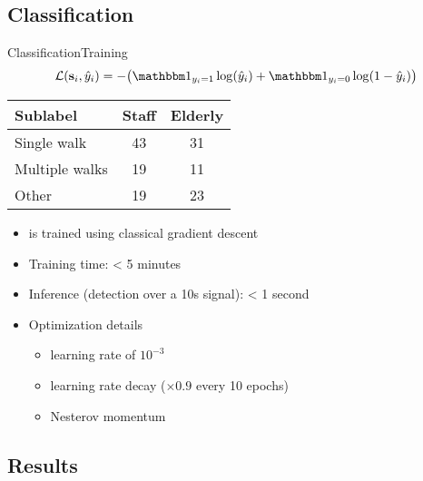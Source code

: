 

\subsection{Classification}

\begin{frame}{Classification}{Training}
\begin{equation*}\label{eq: loss training algp}
    \mathcal{L}(\bfs_i, \hat{y}_i) = - \big( \bbmind_{{y_i =1}} \log( \hat{y}_i ) + \bbmind_{ y_i=0 } \log(1- \hat{y}_i) \big)
\end{equation*}

\begin{table}[h]
    \centering 
    \begin{tabular}{lcc}
    \toprule
    \textbf{Sublabel} & \textbf{Staff} & \textbf{Elderly} \\
    \midrule
    Single walk & 43 & 31 \\
    Multiple walks & 19 & 11 \\
    Other & 19 & 23 \\
    \bottomrule
    \end{tabular}
\end{table}
    \begin{itemize}
        \item \subalgo is trained using classical gradient descent
        \item Training time: < 5 minutes
        \item Inference (detection over a 10s signal): < 1 second
        \item Optimization details
        \begin{itemize}
            \item learning rate of $10^{-3}$
            \item learning rate decay ($\times 0.9$ every 10 epochs)
            \item Nesterov momentum
        \end{itemize}
    \end{itemize}

\end{frame}

\subsection{Results}

